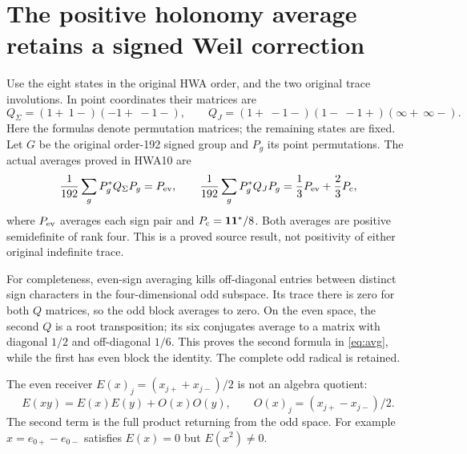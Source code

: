 \documentclass[11pt,a4paper]{article}
\theoremstyle{definition}
\begin{document}
\section{The positive holonomy average retains a signed Weil correction}
Use the eight states in the original HWA order, and the two original trace involutions. In point coordinates their matrices are
\[
 Q_\Sigma=(1+\ 1-)(-1+\ -1-),
 \qquad Q_J=(1+\ -1-)(1-\ -1+)(\infty+\ \infty-).
\]
Here the formulas denote permutation matrices; the remaining states are fixed. Let $G$ be the original order-192 signed group and $P_g$ its point permutations. The actual averages proved in HWA10 are
\begin{equation}\label{eq:avg}
 \frac1{192}\sum_gP_g^*Q_\Sigma P_g=P_{\rm ev},
 \qquad
 \frac1{192}\sum_gP_g^*Q_JP_g
 =\frac13P_{\rm ev}+\frac23P_{\rm c},
\end{equation}
where $P_{\rm ev}$ averages each sign pair and $P_{\rm c}=\mathbf1\mathbf1^*/8$. Both averages are positive semidefinite of rank four. This is a proved source result, not positivity of either original indefinite trace.

For completeness, even-sign averaging kills off-diagonal entries between distinct sign characters in the four-dimensional odd subspace. Its trace there is zero for both $Q$ matrices, so the odd block averages to zero. On the even space, the second $Q$ is a root transposition; its six conjugates average to a matrix with diagonal $1/2$ and off-diagonal $1/6$. This proves the second formula in \eqref{eq:avg}, while the first has even block the identity. The complete odd radical is retained.

The even receiver $E(x)_j=(x_{j+}+x_{j-})/2$ is not an algebra quotient:
\begin{equation}\label{eq:odd}
 E(xy)=E(x)E(y)+O(x)O(y),
 \qquad O(x)_j=(x_{j+}-x_{j-})/2.
\end{equation}
The second term is the full product returning from the odd space. For example $x=e_{0+}-e_{0-}$ satisfies $E(x)=0$ but $E(x^2)\ne0$.
\end{document}

